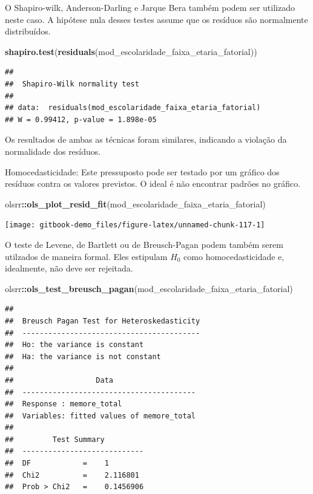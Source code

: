 \documentclass[
]{book}
\newenvironment{Shaded}{\begin{snugshade}}{\end{snugshade}}
\newcommand{\KeywordTok}[1]{\textcolor[rgb]{0.13,0.29,0.53}{\textbf{#1}}}
\newcommand{\NormalTok}[1]{#1}
\newcommand{\OperatorTok}[1]{\textcolor[rgb]{0.81,0.36,0.00}{\textbf{#1}}}
\begin{document}
O Shapiro-wilk, Anderson-Darling e Jarque Bera também podem ser utilizado neste caso. A hipótese nula desses testes assume que os resíduos são normalmente distribuídos.

\begin{Shaded}
\begin{Highlighting}[]
\KeywordTok{shapiro.test}\NormalTok{(}\KeywordTok{residuals}\NormalTok{(mod_escolaridade_faixa_etaria_fatorial))}
\end{Highlighting}
\end{Shaded}

\begin{verbatim}
## 
##  Shapiro-Wilk normality test
## 
## data:  residuals(mod_escolaridade_faixa_etaria_fatorial)
## W = 0.99412, p-value = 1.898e-05
\end{verbatim}

Os resultados de ambas as técnicas foram similares, indicando a violação da normalidade dos resíduos.

Homocedasticidade: Este pressuposto pode ser testado por um gráfico dos resíduos contra os valores previstos. O ideal é não encontrar padrões no gráfico.

\begin{Shaded}
\begin{Highlighting}[]
\NormalTok{olsrr}\OperatorTok{::}\KeywordTok{ols_plot_resid_fit}\NormalTok{(mod_escolaridade_faixa_etaria_fatorial)}
\end{Highlighting}
\end{Shaded}

\begin{center}\texttt{[image: gitbook-demo\_files/figure-latex/unnamed-chunk-117-1]} \end{center}

O teste de Levene, de Bartlett ou de Breusch-Pagan podem também serem utilzados de maneira formal. Eles estipulam \(H_0\) como homocedasticidade e, idealmente, não deve ser rejeitada.

\begin{Shaded}
\begin{Highlighting}[]
\NormalTok{olsrr}\OperatorTok{::}\KeywordTok{ols_test_breusch_pagan}\NormalTok{(mod_escolaridade_faixa_etaria_fatorial)}
\end{Highlighting}
\end{Shaded}

\begin{verbatim}
## 
##  Breusch Pagan Test for Heteroskedasticity
##  -----------------------------------------
##  Ho: the variance is constant            
##  Ha: the variance is not constant        
## 
##                   Data                   
##  ----------------------------------------
##  Response : memore_total 
##  Variables: fitted values of memore_total 
## 
##         Test Summary         
##  ----------------------------
##  DF            =    1 
##  Chi2          =    2.116801 
##  Prob > Chi2   =    0.1456906
\end{verbatim}
\end{document}
